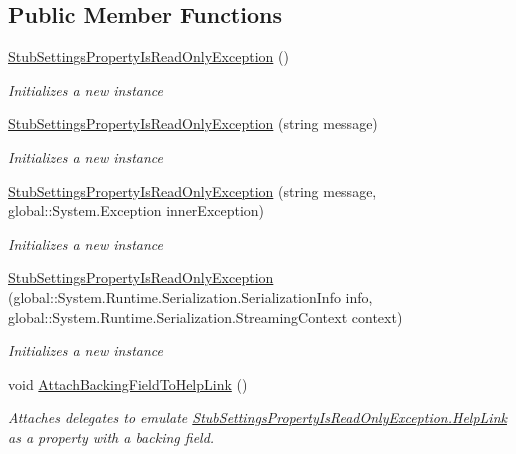 \subsection*{Public Member Functions}
\begin{DoxyCompactItemize}
\item 
\hyperlink{class_system_1_1_configuration_1_1_fakes_1_1_stub_settings_property_is_read_only_exception_ac4f57e2e7ea4427f73468c74d46b8043}{Stub\-Settings\-Property\-Is\-Read\-Only\-Exception} ()
\begin{DoxyCompactList}\small\item\em Initializes a new instance\end{DoxyCompactList}\item 
\hyperlink{class_system_1_1_configuration_1_1_fakes_1_1_stub_settings_property_is_read_only_exception_a96d42a2dac30f00751264d92f2ff2854}{Stub\-Settings\-Property\-Is\-Read\-Only\-Exception} (string message)
\begin{DoxyCompactList}\small\item\em Initializes a new instance\end{DoxyCompactList}\item 
\hyperlink{class_system_1_1_configuration_1_1_fakes_1_1_stub_settings_property_is_read_only_exception_adc3e0a52ae3407f37ee75ee0b99423a6}{Stub\-Settings\-Property\-Is\-Read\-Only\-Exception} (string message, global\-::\-System.\-Exception inner\-Exception)
\begin{DoxyCompactList}\small\item\em Initializes a new instance\end{DoxyCompactList}\item 
\hyperlink{class_system_1_1_configuration_1_1_fakes_1_1_stub_settings_property_is_read_only_exception_acffdfbda46612bee9ba43415ee4309cd}{Stub\-Settings\-Property\-Is\-Read\-Only\-Exception} (global\-::\-System.\-Runtime.\-Serialization.\-Serialization\-Info info, global\-::\-System.\-Runtime.\-Serialization.\-Streaming\-Context context)
\begin{DoxyCompactList}\small\item\em Initializes a new instance\end{DoxyCompactList}\item 
void \hyperlink{class_system_1_1_configuration_1_1_fakes_1_1_stub_settings_property_is_read_only_exception_ad100868e8e83c36accf327c9740876d1}{Attach\-Backing\-Field\-To\-Help\-Link} ()
\begin{DoxyCompactList}\small\item\em Attaches delegates to emulate \hyperlink{class_system_1_1_configuration_1_1_fakes_1_1_stub_settings_property_is_read_only_exception_aef9d6d7665c4d446bee4c1c1276bdec8}{Stub\-Settings\-Property\-Is\-Read\-Only\-Exception.\-Help\-Link} as a property with a backing field.\end{DoxyCompactList}\item 

\end{DoxyCompactItemize}
